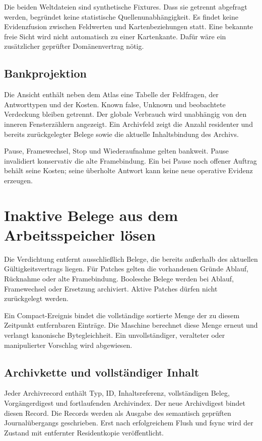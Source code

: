 \documentclass[11pt,a4paper]{article}
\newcommand{\nextsection}[2]{\clearpage{\color{accent}\small\textsf{#1}}\section{#2}}
\begin{document}
Die beiden Weltdateien sind synthetische Fixtures. Dass sie getrennt
abgefragt werden, begründet keine statistische Quellenunabhängigkeit.
Es findet keine Evidenzfusion zwischen Feldwerten und Kartenbeziehungen
statt. Eine bekannte freie Sicht wird nicht automatisch zu einer
Kartenkante. Dafür wäre ein zusätzlicher geprüfter Domänenvertrag nötig.

\subsection{Bankprojektion}
Die Ansicht enthält neben dem Atlas eine Tabelle der Feldfragen,
der Antworttypen und der Kosten. Known false, Unknown und beobachtete
Verdeckung bleiben getrennt. Der globale Verbrauch wird unabhängig
von den inneren Fensterzählern angezeigt. Ein Archivfeld zeigt die
Anzahl residenter und bereits zurückgelegter Belege sowie die
aktuelle Inhaltsbindung des Archivs.

Pause, Framewechsel, Stop und Wiederaufnahme gelten bankweit.
Pause invalidiert konservativ die alte Framebindung. Ein bei Pause
noch offener Auftrag behält seine Kosten; seine überholte Antwort
kann keine neue operative Evidenz erzeugen.

\nextsection{40 / ARCHIVGRENZE}{Inaktive Belege aus dem Arbeitsspeicher lösen}
Die Verdichtung entfernt ausschließlich Belege, die bereits außerhalb
des aktuellen Gültigkeitsvertrags liegen. Für Patches gelten die
vorhandenen Gründe Ablauf, Rücknahme oder alte Framebindung.
Boolesche Belege werden bei Ablauf, Framewechsel oder Ersetzung
archiviert. Aktive Patches dürfen nicht zurückgelegt werden.

Ein Compact-Ereignis bindet die vollständige sortierte Menge der
zu diesem Zeitpunkt entfernbaren Einträge. Die Maschine berechnet
diese Menge erneut und verlangt kanonische Bytegleichheit. Ein
unvollständiger, veralteter oder manipulierter Vorschlag wird abgewiesen.

\subsection{Archivkette und vollständiger Inhalt}
Jeder Archivrecord enthält Typ, ID, Inhaltsreferenz, vollständigen
Beleg, Vorgängerdigest und fortlaufenden Archivindex. Der neue
Archivdigest bindet diesen Record. Die Records werden als Ausgabe
des semantisch geprüften Journalübergangs geschrieben. Erst nach
erfolgreichem Flush und fsync wird der Zustand mit entfernter
Residentkopie veröffentlicht.
\end{document}
